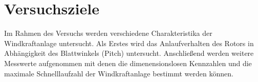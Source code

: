 \section{Versuchsziele}
Im Rahmen des Versuchs werden verschiedene Charakteristika der Windkraftanlage
 untersucht. Als Erstes wird das Anlaufverhalten des Rotors in Abhängigkeit des Blattwinkels (Pitch) untersucht. Anschließend werden weitere Messwerte aufgenommen mit denen die dimenensionslosen Kennzahlen und die maximale Schnelllaufzahl der Windkraftanlage bestimmt werden können.


